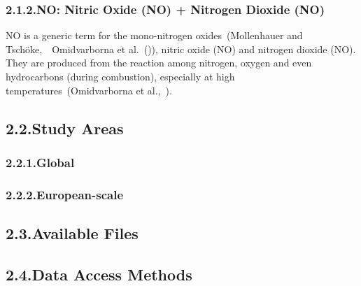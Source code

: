 \documentclass[9pt]{report}
\begin{document}
\subsubsection{2.1.2.\hspace*{0.5em}NO: Nitric Oxide (NO) + Nitrogen Dioxide (NO)}\label{sec-nox--nitric-oxide-no-nitrogen-dioxide-no2}%

\noindent{}NO is a generic term for the mono-nitrogen oxides~(Mollenhauer and Tschöke,~~Omidvarborna et al.~()), nitric oxide (NO) and nitrogen dioxide (NO).
They are produced from the reaction among nitrogen, oxygen and even hydrocarbons (during combustion), especially at high temperatures~(Omidvarborna et al.,~).%

\subsection{2.2.\hspace*{0.5em}Study Areas}\label{sec-study-areas}%

\subsubsection{2.2.1.\hspace*{0.5em}Global}\label{sec-global}%

\subsubsection{2.2.2.\hspace*{0.5em}European-scale}\label{sec-european-scale}%

\subsection{2.3.\hspace*{0.5em}Available Files}\label{sec-available-files}%

\subsection{2.4.\hspace*{0.5em}Data Access Methods}\label{sec-data-access-methods}%
\end{document}
